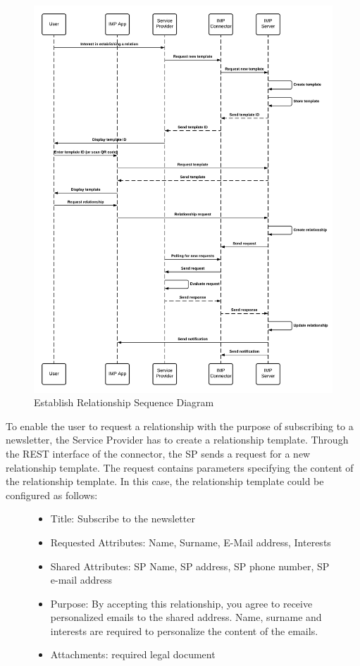 \begin{figure}[H]
    \centering
    \includegraphics[scale=0.6]{Diagrams/IMP Use Case Establish Relationship Sequence Diagram.pdf}
    \caption{Establish Relationship Sequence Diagram}
    \label{imp:establish_relationship}
\end{figure}

To enable the user to request a relationship with the purpose of subscribing to a newsletter, the Service Provider has to create a relationship template. Through the REST interface of the connector, the SP sends a request for a new relationship template. The request contains parameters specifying the content of the relationship template. In this case, the relationship template could be configured as follows:

\begin{figure}[H]
    \begin{itemize}
    \item Title: Subscribe to the newsletter
    \item Requested Attributes: Name, Surname, E-Mail address, Interests
    \item Shared Attributes: SP Name, SP address, SP phone number, SP e-mail address
    \item Purpose: By accepting this relationship, you agree to receive personalized emails to the shared address. Name, surname and interests are required to personalize the content of the emails.
    \item Attachments: required legal document
\end{itemize}
\end{figure}


